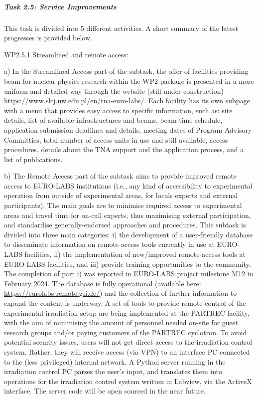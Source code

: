 \subparagraph{Task 2.5: Service Improvements } \mbox{}


This task is divided into 5 different activities. A short summary of the latest progresses is provided below.

WP2.5.1 Streamlined and remote access: 

a) In the Streamlined Access part of the subtask, the offer of facilities providing beam for nuclear physics research within the WP2 package is presented in a more uniform and detailed way  through the website (still under construction) \url{https://www.slcj.uw.edu.pl/en/tna-euro-labs/}. Each facility has its own subpage with a menu that provides easy access to specific information, such as: site details, list of available infrastructures and beams, beam time schedule, application submission deadlines and details, meeting dates of Program Advisory Committies, total number of access units in use and still available, access procedures, details about the TNA support and the application process, and a list of publications. 

b) The Remote Access part of the subtask aims to provide improved remote access to EURO-LABS institutions (i.e., any kind of accessibility to experimental operation from outside of experimental areas, for locals experts and external participants). The main goals are to minimise required access to experimental areas and travel time for on-call experts, thus maximising external participation, and standardise generally-endorsed approaches and procedures. This subtask is divided into three main categories: i) the development of a user-friendly database to disseminate information on remote-access tools currently in use at EURO-LABS facilities, ii) the implementation of new/improved remote-access tools at EURO-LABS facilities, and iii) provide training opportunities to the community. The completion of part i) was reported in EURO-LABS project milestone M12 in February 2024. The database is fully operational (available here: \url{https://eurolabs-remote.gsi.de/}) and the collection of further information to expand the content is underway. A set of tools to provide remote control of the experimental irradiation setup are being implemented at the PARTREC facility, with the aim of minimising the amount of personnel needed on-site for guest research groups and/or paying customers of the PARTREC cyclotron.
To avoid potential security issues, users will not get direct access to the irradiation control system. Rather, they will receive access (via VPN) to an interface PC connected to the (less privileged) internal network.
A Python server running in the irradiation control PC parses the user’s input, and translates them into operations for the irradiation control system written in Labview, via the ActiveX interface. The server code will be open sourced in the near future.

